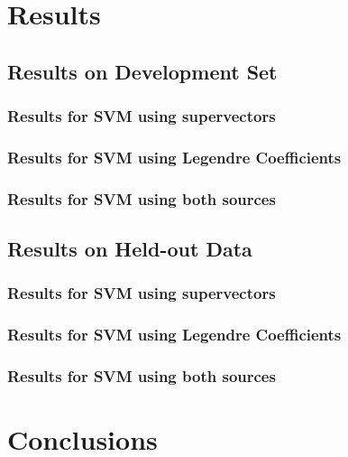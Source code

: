 \documentclass[11pt,a4paper]{tesis}
\begin{document}
\chapter{Results}
	\section{Results on Development Set}
		\subsection{Results for SVM using supervectors}
		\subsection{Results for SVM using Legendre Coefficients}
		\subsection{Results for SVM using both sources}
	\section{Results on Held-out Data}
		\subsection{Results for SVM using supervectors}
		\subsection{Results for SVM using Legendre Coefficients}
		\subsection{Results for SVM using both sources}
\chapter{Conclusions}
 
\end{document}
